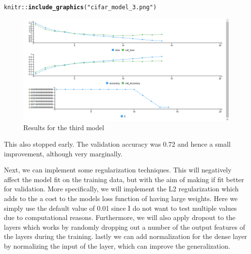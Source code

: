 \documentclass[10pt, a4paper, english]{article}\usepackage[]{graphicx}\usepackage[dvipsnames]{xcolor}
\makeatletter
\def\maxwidth{ %
  \ifdim\Gin@nat@width>\linewidth
    \linewidth
  \else
    \Gin@nat@width
  \fi
}
\newcommand{\hlstr}[1]{\textcolor[rgb]{0.192,0.494,0.8}{#1}}%
\newcommand{\hlopt}[1]{\textcolor[rgb]{0,0,0}{#1}}%
\newcommand{\hlstd}[1]{\textcolor[rgb]{0.345,0.345,0.345}{#1}}%
\newcommand{\hlkwd}[1]{\textcolor[rgb]{0.737,0.353,0.396}{\textbf{#1}}}%
\newenvironment{kframe}{%
 \def\at@end@of@kframe{}%
 \ifinner\ifhmode%
  \def\at@end@of@kframe{\end{minipage}}%
  \begin{minipage}{\columnwidth}%
 \fi\fi%
 \def\FrameCommand##1{\hskip\@totalleftmargin \hskip-\fboxsep
 \colorbox{shadecolor}{##1}\hskip-\fboxsep
     \hskip-\linewidth \hskip-\@totalleftmargin \hskip\columnwidth}%
 \MakeFramed {\advance\hsize-\width
   \@totalleftmargin\z@ \linewidth\hsize
   \@setminipage}}%
 {\par\unskip\endMakeFramed%
 \at@end@of@kframe}
\newenvironment{knitrout}{}{} %
\makeatother
\begin{document}
\begin{knitrout}
\color{fgcolor}\begin{kframe}
\begin{alltt}
\hlstd{knitr}\hlopt{::}\hlkwd{include_graphics}\hlstd{(}\hlstr{"cifar_model_3.png"}\hlstd{)}
\end{alltt}
\end{kframe}\begin{figure}
\includegraphics[width=\maxwidth]{cifar_model_3} \caption[Results for the third model]{Results for the third model}\label{fig:unnamed-chunk-29}
\end{figure}

\end{knitrout}
This also stopped early. The validation accuracy was 0.72 and hence a small improvement, although very marginally. 


Next, we can implement some regularization techniques. This will negatively affect the model fit on the training data, but with the aim of making if fit better for validation. More specifically, we will implement the L2 regularization which adds to the a cost to the models loss function of having large weights. Here we simply use the default value of 0.01 since I do not want to test multiple values due to computational reasons.  Furthermore, we will also apply dropout to the layers which works by randomly dropping out a number of the output features of the layers during the training. lastly we can add normalization for the dense layer by normalizing the input of the layer, which can improve the generalization. 
\end{document}
